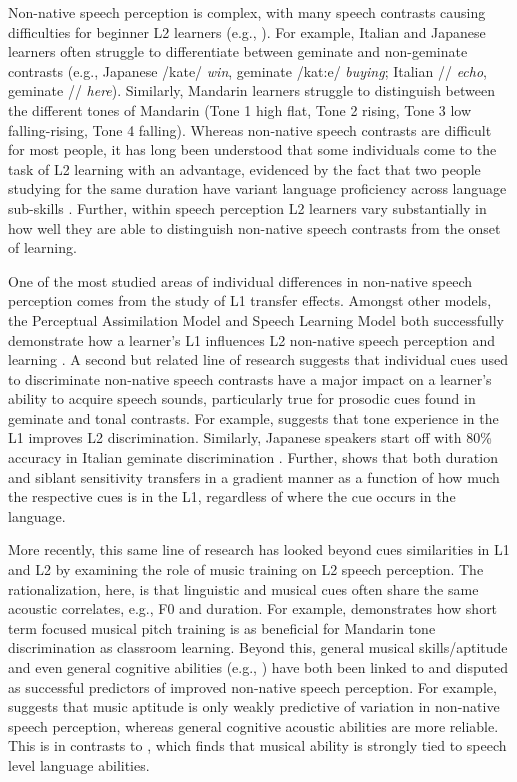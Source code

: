 \documentclass[a4paper]{article}
\begin{document}
Non-native speech perception is complex, with many speech contrasts causing difficulties for beginner L2 learners (e.g., \cite{Flege_95}). For example, Italian and Japanese learners often struggle to differentiate between geminate and non-geminate contrasts (e.g., Japanese /kate/ \textit{win}, geminate /kat:e/ \textit{buying}; Italian // \textit{echo}, geminate // \textit{here}). Similarly, Mandarin learners struggle to distinguish between the different tones of Mandarin (Tone 1 high flat, Tone 2 rising, Tone 3 low falling-rising, Tone 4 falling)\cite{Pelzl_2021}. Whereas non-native speech contrasts are difficult for most people, it has long been understood that some individuals come to the task of L2 learning with an advantage, evidenced by the fact that two people studying for the same duration have variant language proficiency across language sub-skills \cite{Zheng_2021}. Further, within speech perception L2 learners vary substantially in how well they are able to distinguish non-native speech contrasts from the onset of learning.

One of the most studied areas of individual differences in non-native speech perception comes from the study of L1 transfer effects. Amongst other models, the Perceptual Assimilation Model and Speech Learning Model both successfully demonstrate how a learner’s L1 influences L2 non-native speech perception and learning \cite{Flege_95,Best_1995}. A second but related line of research suggests that individual cues used to discriminate non-native speech contrasts have a major impact on a learner's ability to acquire speech sounds, particularly true for prosodic cues found in geminate and tonal contrasts. For example, \cite{Francis_2008} suggests that tone experience in the L1 improves L2 discrimination.
Similarly, Japanese speakers start off with 80\% accuracy in Italian geminate discrimination \cite{Tsukada_Cox_Hajek_Hirata_2017}. Further, \cite{Pajak_2014} shows that both duration and siblant sensitivity transfers in a gradient manner as a function of how much the respective cues is in the L1, regardless of where the cue occurs in the language. 

More recently, this same line of research has looked beyond cues similarities in L1 and L2 by examining the role of music training on L2 speech perception. The rationalization, here, is that linguistic and musical cues often share the same acoustic correlates, e.g., F0 and duration. For example, \cite{Wiener_Bradley_2020} demonstrates how short term focused musical pitch training is as beneficial for Mandarin tone discrimination as classroom learning. Beyond this, general musical skills/aptitude and even general cognitive abilities (e.g., \cite{Zheng_2021}) have both been linked to and disputed as successful predictors of improved non-native speech perception. For example, \cite{Zheng_2021} suggests that music aptitude is only weakly predictive of variation in non-native speech perception, whereas general cognitive acoustic abilities are more reliable. This is in contrasts to \cite{Slevc_2006}, which finds that musical ability is strongly tied to speech level language abilities. 
\end{document}
